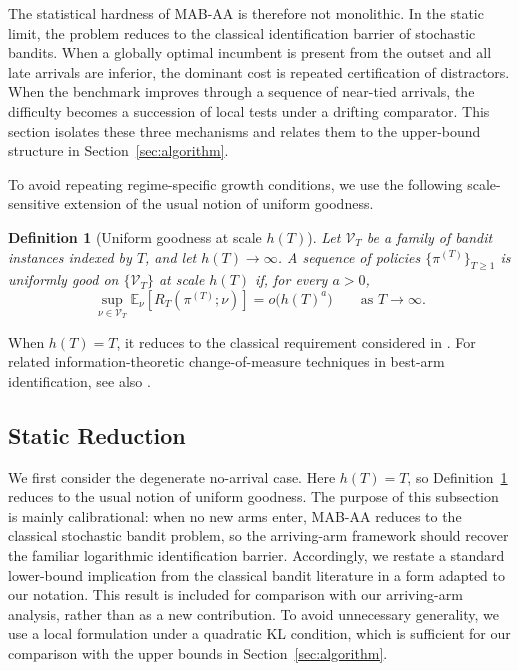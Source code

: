 \documentclass[11pt]{article}
\newtheorem{definition}{Definition}
\begin{document}
The statistical hardness of MAB-AA is therefore not monolithic. In the static limit, the problem reduces to the classical identification barrier of stochastic bandits. When a globally optimal incumbent is present from the outset and all late arrivals are inferior, the dominant cost is repeated certification of distractors. When the benchmark improves through a sequence of near-tied arrivals, the difficulty becomes a succession of local tests under a drifting comparator. This section isolates these three mechanisms and relates them to the upper-bound structure in Section~\ref{sec:algorithm}.

To avoid repeating regime-specific growth conditions, we use the following scale-sensitive extension of the usual notion of uniform goodness.

\begin{definition}[Uniform goodness at scale $h(T)$]
\label{def:uniformly-good-scale}
Let $\mathcal V_T$ be a family of bandit instances indexed by $T$, and let $h(T)\to\infty$.
A sequence of policies $\{\pi^{(T)}\}_{T\ge1}$ is \emph{uniformly good on $\{\mathcal V_T\}$ at
scale $h(T)$} if, for every $a>0$,
\[
\sup_{\nu\in\mathcal V_T}\mathbb E_{\nu}[R_T(\pi^{(T)};\nu)]
=
o\bigl(h(T)^a\bigr)
\qquad\text{as }T\to\infty.
\]
\end{definition} 


 When $h(T)=T$, it reduces to the classical requirement considered in \textcite{LAI19854,BurnetasKatehakis1996}. For related information-theoretic change-of-measure techniques in best-arm
identification, see also \textcite{KaufmannCappeGarivier2016}.

\subsection{Static Reduction}



We first consider the degenerate no-arrival case. Here $h(T)=T$, so
Definition~\ref{def:uniformly-good-scale} reduces to the usual notion of uniform goodness.
The purpose of this subsection is mainly calibrational: when no new arms enter, MAB-AA
reduces to the classical stochastic bandit problem, so the arriving-arm framework should
recover the familiar logarithmic identification barrier. Accordingly, we restate a standard
lower-bound implication from the classical bandit literature
\parencite{LAI19854,BurnetasKatehakis1996} in a form adapted to our notation. This result
is included for comparison with our arriving-arm analysis, rather than as a new contribution.
To avoid unnecessary generality, we use a local formulation under a quadratic KL condition,
which is sufficient for our comparison with the upper bounds in
Section~\ref{sec:algorithm}.
\end{document}
